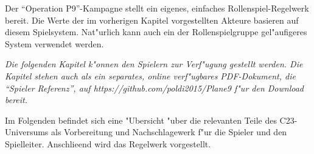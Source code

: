 
Der ``Operation P9''-Kampagne stellt ein eigenes, einfaches Rollenspiel-Regelwerk bereit. Die Werte der im vorherigen Kapitel vorgestellten Akteure basieren auf diesem Spielsystem. Nat"urlich kann auch ein der Rollenspielgruppe gel"aufigeres System verwendet werden.

\emph{Die folgenden Kapitel k"onnen den Spielern zur Verf"ugung gestellt werden. Die Kapitel stehen auch als ein separates, online verf"ugbares PDF-Dokument, die ``Spieler Referenz'', auf \textit{https://github.com/poldi2015/Plane9} f"ur den Download bereit.}

Im Folgenden befindet sich eine "Ubersicht "uber die relevanten Teile des C23-Universums als Vorbereitung und Nachschlagewerk f"ur die Spieler und den Spielleiter. Anschlie\3end wird das Regelwerk vorgestellt.





\newpage
\thispagestyle{empty}
\null
\newpage
